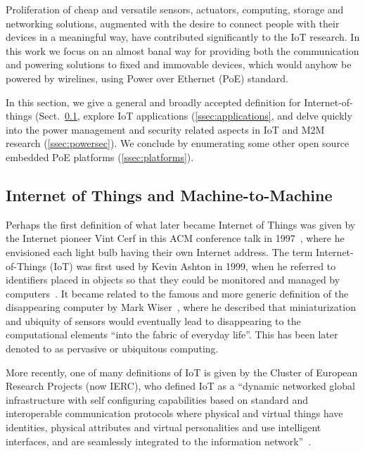 \documentclass{siamltex}
\begin{document}
Proliferation of cheap and versatile sensors, actuators, computing, storage and
networking solutions, augmented with the desire to connect people with their
devices in a meaningful way, have contributed significantly to the IoT
research. 
In this work we focus on an
almost banal way for providing both the communication and powering solutions to
fixed and immovable devices, which would anyhow be powered by wirelines, using
Power over Ethernet (PoE) standard. 

In this section, we give a general and broadly accepted definition for
Internet-of-things (Sect.~\ref{ssec:definition}, explore IoT
applications (\ref{ssec:applications}, and delve quickly into the
power management and security related aspects in IoT and M2M research
(\ref{ssec:powersec}).  We conclude by enumerating some
other open source embedded PoE platforms (\ref{ssec:platforms}).


\subsection{Internet of Things and Machine-to-Machine}
\label{ssec:definition}

Perhaps the first definition of what later became Internet of Things
was given by the Internet pioneer Vint Cerf in this ACM conference
talk in 1997~\cite{cerf1997next}, where he envisioned each light bulb
having their own Internet address.
The term Internet-of-Things (IoT) was first used
by Kevin Ashton in 1999, when he referred to identifiers
placed in objects so that they could be monitored and managed by
computers~\cite{ashton2009internet}.  It
became related to the famous and more generic definition of the
disappearing computer by Mark Wiser~\cite{weiser1991computer}, where he
described that miniaturization and ubiquity of sensors would
eventually lead to disappearing to the computational elements ``into
the fabric of everyday life''.  This has been later denoted to as
pervasive or ubiquitous computing.

More recently, one of many definitions of IoT is given by the Cluster
of European Research
Projects (now IERC), who defined IoT as a ``dynamic networked global
infrastructure with self configuring capabilities based on standard
and interoperable communication protocols where physical and virtual
things have identities, physical attributes and virtual personalities
and use intelligent interfaces, and are seamlessly integrated to the
information network''~\cite{vermesan2011internet}.
\end{document}
